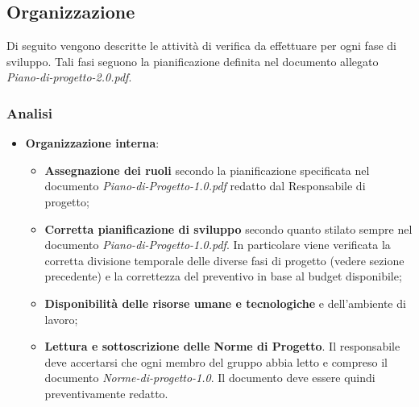 \documentclass[a4paper,11pt]{article}
\begin{document}
\subsection{Organizzazione}
Di seguito vengono descritte le attività di verifica da effettuare per ogni fase di sviluppo. Tali fasi seguono la pianificazione definita nel documento allegato \textit{Piano-di-progetto-2.0.pdf}.
\subsubsection{Analisi}
\begin{itemize}
\item \textbf{Organizzazione interna}:
\begin{itemize}
\item \textbf{Assegnazione dei ruoli} secondo la pianificazione specificata nel documento \textit{Piano-di-Progetto-1.0.pdf} redatto dal Responsabile di progetto;
\item \textbf{Corretta pianificazione di sviluppo} secondo quanto stilato sempre nel documento \textit{Piano-di-Progetto-1.0.pdf}. In particolare viene verificata la corretta divisione temporale delle diverse fasi di progetto (vedere sezione precedente) e la correttezza del preventivo in base al budget disponibile;
\item \textbf{Disponibilità delle risorse umane e tecnologiche} e dell'ambiente di lavoro;
\item \textbf{Lettura e sottoscrizione delle Norme di Progetto}. Il responsabile deve accertarsi che ogni membro del gruppo abbia letto e compreso il documento \textit{Norme-di-progetto-1.0}. Il documento deve essere quindi preventivamente redatto.


\end{itemize} 
 

\end{itemize}
\end{document}
